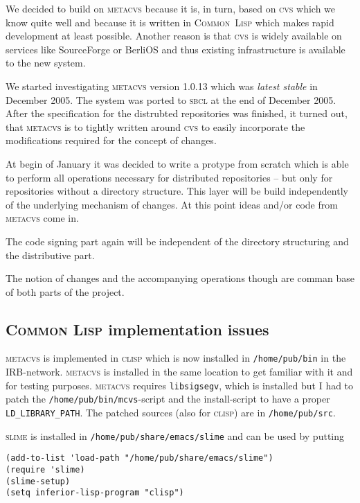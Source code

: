 \documentclass[fleqn, 10pt, a4paper]{article}
\begin{document}
We decided to build on \textsc{metacvs} because it is, in turn, based on
\textsc{cvs} which we know quite well and because it is written in
\textsc{Common~Lisp} which makes rapid development at least possible.
Another reason is that \textsc{cvs} is widely available on services
like SourceForge or BerliOS and thus existing infrastructure
is available to the new system.

We started investigating \textsc{metacvs} version 1.0.13 which was
\emph{latest stable} in December 2005.
The system was ported to \textsc{sbcl} at the end of December 2005.
After the specification for the distrubted repositories was finished,
it turned out, that \textsc{metacvs} is to tightly written around
\textsc{cvs} to easily incorporate the modifications required
for the concept of changes.

At begin of January it was decided to write a protype from scratch
which is able to perform all operations necessary for
distributed repositories -- but only for repositories without a
directory structure. This layer will be build independently of the
underlying mechanism of changes. At this point ideas and/or code
from \textsc{metacvs} come in.

The code signing part again will be independent of the directory
structuring and the distributive part.

The notion of changes and the accompanying operations though are
comman base of both parts of the project.

\subsection{\textsc{Common Lisp} implementation issues}

\textsc{metacvs} is implemented in \textsc{clisp} which is now installed
in \texttt{/home/pub/bin} in the IRB-network. \textsc{metacvs} is
installed in the same location to get familiar with it and for testing
purposes. \textsc{metacvs} requires \texttt{libsigsegv}, which is
installed but I had to patch the \texttt{/home/pub/bin/mcvs}-script and
the install-script to have a proper \texttt{LD\_LIBRARY\_PATH}. The
patched sources (also for \textsc{clisp}) are in \texttt{/home/pub/src}.

\textsc{slime} is installed in \texttt{/home/pub/share/emacs/slime} and
can be used by putting
\begin{verbatim}
(add-to-list 'load-path "/home/pub/share/emacs/slime")
(require 'slime)
(slime-setup)
(setq inferior-lisp-program "clisp")
\end{verbatim}
\end{document}
